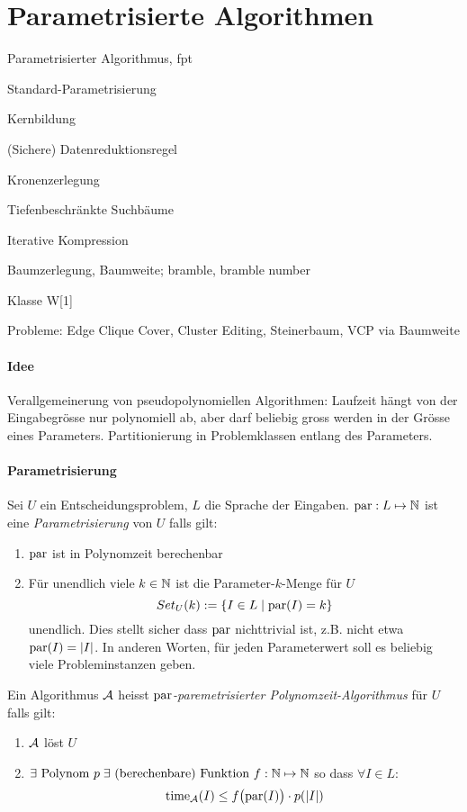 \section{Parametrisierte Algorithmen}

\begin{takeaway}
    \item Parametrisierter Algorithmus, fpt
    \item Standard-Parametrisierung
    \item Kernbildung
    \item (Sichere) Datenreduktionsregel
    \item Kronenzerlegung
    \item Tiefenbeschränkte Suchbäume
    \item Iterative Kompression
    \item Baumzerlegung, Baumweite; bramble, bramble number
    \item Klasse W[1]
    \item Probleme: Edge Clique Cover, Cluster Editing, Steinerbaum, VCP via Baumweite
\end{takeaway}

\paragraph{Idee}
Verallgemeinerung von pseudopolynomiellen Algorithmen:
Laufzeit hängt von der Eingabegrösse nur polynomiell ab, aber darf beliebig gross 
werden in der Grösse eines Parameters.
Partitionierung in Problemklassen entlang des Parameters.

\paragraph{Parametrisierung}
Sei $U$ ein Entscheidungsproblem, $L$ die Sprache der Eingaben.
$\text{par}: L \mapsto \mathbb{N}$ ist eine \emph{Parametrisierung} von $U$ falls gilt:
\begin{enumerate}[label=(\roman*)]
    \item $\text{par}$ ist in Polynomzeit berechenbar
    \item Für unendlich viele $k \in \mathbb{N}$ ist die Parameter-$k$-Menge für $U$
    $$ Set_U(k) := \{ I \in L \; | \; \text{par}(I) = k \} $$ unendlich.
    Dies stellt sicher dass $\text{par}$ nichttrivial ist, z.B. nicht etwa $\text{par}(I) = |I|$.
    In anderen Worten, für jeden Parameterwert soll es beliebig viele Probleminstanzen geben.
\end{enumerate}
Ein Algorithmus $\mathcal{A}$ heisst \emph{$\text{par}$-paremetrisierter Polynomzeit-Algorithmus} für $U$ falls gilt:
\begin{enumerate}[label=(\roman*)]
    \item $\mathcal{A}$ löst $U$
    \item $ \exists \text{ Polynom } p \; \exists \text{ (berechenbare) Funktion } f : \mathbb{N} \mapsto \mathbb{N}$
    so dass $\forall I \in L$:
    $$\text{time}_{\mathcal{A}}(I) \leq f \big( \text{par}(I) \big) \cdot p(|I|) $$
\end{enumerate}

